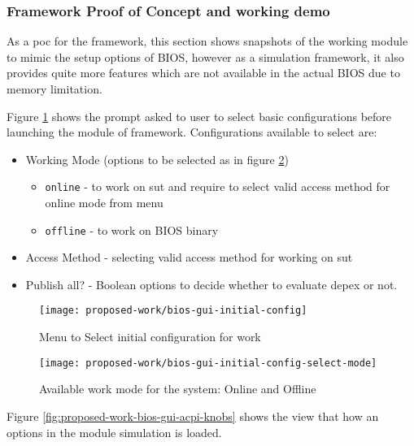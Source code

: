 \subsubsection{Framework Proof of Concept and working demo}
As a \gls{poc} for the framework, this section shows snapshots of the working module to mimic the setup options of BIOS, however as a simulation framework, it also provides quite more features which are not available in the actual BIOS due to memory limitation.

Figure \ref{fig:proposed-work-bios-gui-initial-config} shows the prompt asked to user to select basic configurations before launching the module of framework. Configurations available to select are:

\begin{itemize}
	\item Working Mode (options to be selected as in figure \ref{fig:proposed-work-bios-gui-initial-config-select-mode})
	\begin{itemize}
		\item \verb|online| - to work on \gls{sut} and require to select valid access method for online mode from menu
		\item \verb|offline| - to work on BIOS binary
	\end{itemize}
	\item Access Method - selecting valid access method for working on \gls{sut}
	\item Publish all? - Boolean options to decide whether to evaluate \gls{depex} or not. 
\end{itemize}

\begin{figure}[!htbp]
	\centering
	\texttt{[image: proposed-work/bios-gui-initial-config]}
	\caption{Menu to Select initial configuration for work}\label{fig:proposed-work-bios-gui-initial-config}
\end{figure}

\begin{figure}[!htbp]
	\centering
	\texttt{[image: proposed-work/bios-gui-initial-config-select-mode]}
	\caption{Available work mode for the system: Online and Offline}\label{fig:proposed-work-bios-gui-initial-config-select-mode}
\end{figure}


Figure \ref{fig:proposed-work-bios-gui-acpi-knobs} shows the view that how an options in the module simulation is loaded.


